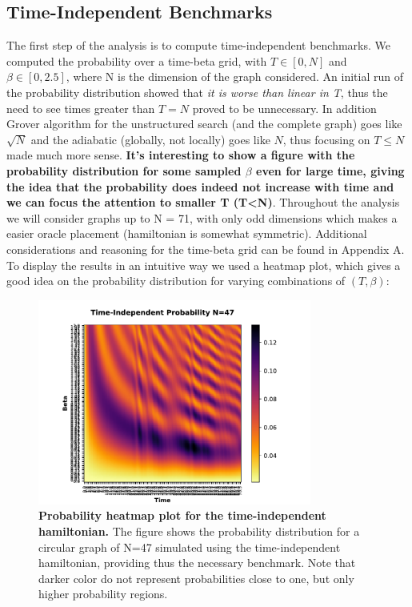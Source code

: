     \subsection{Time-Independent Benchmarks}
        The first step of the analysis is to compute time-independent benchmarks. We computed the probability over a time-beta grid, with $T\in[0,N]$ and $\beta\in[0,2.5]$, where N is the dimension of the graph considered. An initial run of the probability distribution showed that \textit{it is worse than linear in T}, thus the need to see times greater than $T=N$ proved to be unnecessary. In addition Grover algorithm for the unstructured search (and the complete graph) goes like $\sqrt{N}$ and the adiabatic (globally, not locally) goes like $N$, thus focusing on $T \leq N$ made much more sense. \textbf{It's interesting to show a figure with the probability distribution for some sampled $\beta$ even for large time, giving the idea that the probability does indeed not increase with time and we can focus the attention to smaller T (T<N)}.
        Throughout the analysis we will consider graphs up to N = 71, with only odd dimensions which makes a easier oracle placement (hamiltonian is somewhat symmetric). Additional considerations and reasoning for the time-beta grid can be found in Appendix A. \\


        To display the results in an intuitive way we used a heatmap plot, which gives a good idea on the probability distribution for varying combinations of $(T,\beta)$:

          \begin{figure}[ht]
            \centering
            \includegraphics[width=9cm]{./figures/time_independent_benchmark_47}%
            \caption[Probability heatmap plot for the time-independent hamiltonian, N=47]{\textbf{Probability heatmap plot for the time-independent hamiltonian.} The figure shows the probability distribution for a circular graph of N=47 simulated using the time-independent hamiltonian, providing thus the necessary benchmark. Note that darker color do not represent probabilities close to one, but only higher probability regions.}
          \end{figure}

